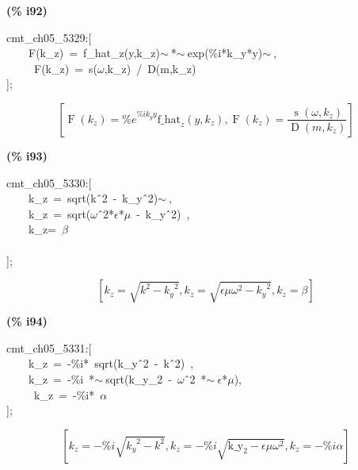 \documentclass[fleqn]{article}
\begin{document}
\noindent
\begin{minipage}[t]{4.000000em}\color{red}\bfseries
(\% i92)	
\end{minipage}
\begin{minipage}[t]{\textwidth}\color{blue}
cmt\_ch05\_5329:[\\
\ \ \ \ F(k\_z)\ =\ f\_hat\_z(y,k\_z)\ensuremath{\sim\ }*\ensuremath{\sim\ }exp(\%i*k\_y*y)\ensuremath{\sim\ },\\
\ \ \ \ \ F(k\_z)\ =\ s(\ensuremath{\omega},k\_z)\ /\ D(m,k\_z)\\
];
\end{minipage}
\[\displaystyle \tag{\% o92} 
\left[ \operatorname{F}\left( {k_z}\right) ={{\% e}^{\% i {k_y} y}} {{\ensuremath{\mathrm{f\_ hat}}}_z}\left( y\operatorname{,}{k_z}\right) \operatorname{,}\operatorname{F}\left( {k_z}\right) =\frac{\operatorname{s}\left( \omega \operatorname{,}{k_z}\right) }{\operatorname{D}\left( m\operatorname{,}{k_z}\right) }\right] \mbox{}
\]


\noindent
\begin{minipage}[t]{4.000000em}\color{red}\bfseries
(\% i93)	
\end{minipage}
\begin{minipage}[t]{\textwidth}\color{blue}
cmt\_ch05\_5330:[\\
\ \ \ \ k\_z\ =\ sqrt(k\^\ 2\ -\ k\_y\^\ 2)\ensuremath{\sim\ },\\
\ \ \ \ k\_z\ =\ sqrt(\ensuremath{\omega}\^\ 2*\ensuremath{\epsilon}*\ensuremath{\mu}\ -\ k\_y\^\ 2)\ ,\\
\ \ \ \ k\_z=\ \ensuremath{\beta}\\
\\
];
\end{minipage}
\[\displaystyle \tag{\% o93} 
\left[ {k_z}=\sqrt{{{k}^{2}}-{{{k_y}}^{2}}}\operatorname{,}{k_z}=\sqrt{\epsilon  \mu  {{\omega }^{2}}-{{{k_y}}^{2}}}\operatorname{,}{k_z}=\beta \right] \mbox{}
\]


\noindent
\begin{minipage}[t]{4.000000em}\color{red}\bfseries
(\% i94)	
\end{minipage}
\begin{minipage}[t]{\textwidth}\color{blue}
cmt\_ch05\_5331:[\\
\ \ \ \ k\_z\ =\ -\%i*\ sqrt(k\_y\^\ 2\ -\ k\^\ 2)\ ,\\
\ \ \ \ k\_z\ =\ -\%i\ *\ensuremath{\sim\ }sqrt(k\_y\_2\ -\ \ensuremath{\omega}\^\ 2\ *\ensuremath{\sim\ }\ensuremath{\epsilon}*\ensuremath{\mu}),\\
\ \ \ \ \ k\_z\ =\ -\%i*\ \ensuremath{\alpha}\\
];
\end{minipage}
\[\displaystyle \tag{\% o94} 
\left[ {k_z}=-\% i \sqrt{{{{k_y}}^{2}}-{{k}^{2}}}\operatorname{,}{k_z}=-\% i \sqrt{{{\ensuremath{\mathrm{k\_ y}}}_2}-\epsilon  \mu  {{\omega }^{2}}}\operatorname{,}{k_z}=-\% i \alpha \right] \mbox{}
\]
\end{document}
